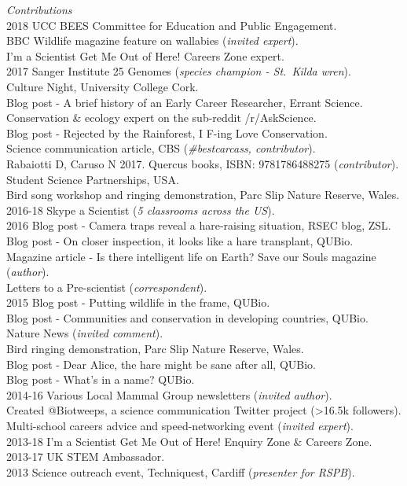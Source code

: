 \documentclass[]{article}
\begin{document}
\emph{Contributions}\\
2018 UCC BEES Committee for Education and Public Engagement.\\
BBC Wildlife magazine feature on wallabies (\emph{invited expert}).\\
I'm a Scientist Get Me Out of Here! Careers Zone expert.\\
2017 Sanger Institute 25 Genomes (\emph{species champion - St.~Kilda
wren}).\\
Culture Night, University College Cork.\\
Blog post - A brief history of an Early Career Researcher, Errant
Science.\\
Conservation \& ecology expert on the sub-reddit /r/AskScience.\\
Blog post - Rejected by the Rainforest, I F-ing Love Conservation.\\
Science communication article, CBS (\emph{\#bestcarcass,
contributor}).\\
Rabaiotti D, Caruso N 2017. Quercus books, ISBN: 9781786488275
(\emph{contributor}).\\
Student Science Partnerships, USA.\\
Bird song workshop and ringing demonstration, Parc Slip Nature Reserve,
Wales.\\
2016-18 Skype a Scientist (\emph{5 classrooms across the US}).\\
2016 Blog post - Camera traps reveal a hare-raising situation, RSEC
blog, ZSL.\\
Blog post - On closer inspection, it looks like a hare transplant,
QUBio.\\
Magazine article - Is there intelligent life on Earth? Save our Souls
magazine (\emph{author}).\\
Letters to a Pre-scientist (\emph{correspondent}).\\
2015 Blog post - Putting wildlife in the frame, QUBio.\\
Blog post - Communities and conservation in developing countries,
QUBio.\\
Nature News (\emph{invited comment}).\\
Bird ringing demonstration, Parc Slip Nature Reserve, Wales.\\
Blog post - Dear Alice, the hare might be sane after all, QUBio.\\
Blog post - What's in a name? QUBio.\\
2014-16 Various Local Mammal Group newsletters (\emph{invited
author}).\\
Created @Biotweeps, a science communication Twitter project
(\textgreater{}16.5k followers).\\
Multi-school careers advice and speed-networking event (\emph{invited
expert}).\\
2013-18 I'm a Scientist Get Me Out of Here! Enquiry Zone \& Careers
Zone.\\
2013-17 UK STEM Ambassador.\\
2013 Science outreach event, Techniquest, Cardiff (\emph{presenter for
RSPB}).
\end{document}

